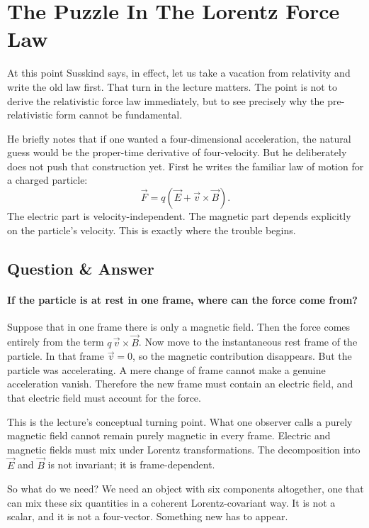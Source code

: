 \section{The Puzzle In The Lorentz Force Law}

At this point Susskind says, in effect, let us take a vacation from relativity and write the old law first. That turn in the lecture matters. The point is not to derive the relativistic force law immediately, but to see precisely why the pre-relativistic form cannot be fundamental.

He briefly notes that if one wanted a four-dimensional acceleration, the natural guess would be the proper-time derivative of four-velocity. But he deliberately does not push that construction yet. First he writes the familiar law of motion for a charged particle:
\begin{equation}
\vec F=q\left(\vec E+\vec v\times\vec B\right).
\end{equation}
The electric part is velocity-independent. The magnetic part depends explicitly on the particle's velocity. This is exactly where the trouble begins.

\subsection{Question \& Answer}

\paragraph{If the particle is at rest in one frame, where can the force come from?}

Suppose that in one frame there is only a magnetic field. Then the force comes entirely from the term \(q\,\vec v\times\vec B\). Now move to the instantaneous rest frame of the particle. In that frame \(\vec v=0\), so the magnetic contribution disappears. But the particle was accelerating. A mere change of frame cannot make a genuine acceleration vanish. Therefore the new frame must contain an electric field, and that electric field must account for the force.

This is the lecture's conceptual turning point. What one observer calls a purely magnetic field cannot remain purely magnetic in every frame. Electric and magnetic fields must mix under Lorentz transformations. The decomposition into \(\vec E\) and \(\vec B\) is not invariant; it is frame-dependent.

So what do we need? We need an object with six components altogether, one that can mix these six quantities in a coherent Lorentz-covariant way. It is not a scalar, and it is not a four-vector. Something new has to appear.

